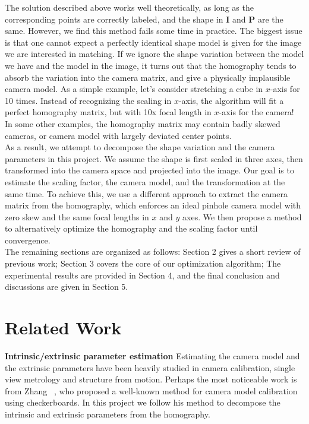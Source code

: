 \documentclass[10pt,twocolumn,letterpaper]{article}
\begin{document}
\noindent
The solution described above works well theoretically, as long as the corresponding points are correctly labeled, and the shape in $\mathbf{I}$ and $\mathbf{P}$ are the same. However, we find this method fails some time in practice. The biggest issue is that one cannot expect a perfectly identical shape model is given for the image we are interested in matching. If we ignore the shape variation between the model we have and the model in the image, it turns out that the homography tends to absorb the variation into the camera matrix, and give a physically implausible camera model. As a simple example, let's consider stretching a cube in $x$-axis for 10 times. Instead of recognizing the scaling in $x$-axis, the algorithm will fit a perfect homography matrix, but with 10x focal length in $x$-axis for the camera! In some other examples, the homography matrix may contain badly skewed cameras, or camera model with largely deviated center points.\\

\noindent
As a result, we attempt to decompose the shape variation and the camera parameters in this project. We assume the shape is first scaled in three axes, then transformed into the camera space and projected into the image. Our goal is to estimate the scaling factor, the camera model, and the transformation at the same time. To achieve this, we use a different approach to extract the camera matrix from the homography, which enforces an ideal pinhole camera model with zero skew and the same focal lengths in $x$ and $y$ axes. We then propose a method to alternatively optimize the homography and the scaling factor until convergence.\\

\noindent
The remaining sections are organized as follows: Section 2 gives a short review of previous work; Section 3 covers the core of our optimization algorithm; The experimental results are provided in Section 4, and the final conclusion and discussions are given in Section 5.

\section{Related Work}
\noindent
\textbf{Intrinsic/extrinsic parameter estimation} Estimating the camera model and the extrinsic parameters have been heavily studied in camera calibration, single view metrology and structure from motion. Perhaps the most noticeable work is from Zhang ~\cite{zhang2000flexible}, who proposed a well-known method for camera model calibration using checkerboards. In this project we follow his method to decompose the intrinsic and extrinsic parameters from the homography.\\
\end{document}
